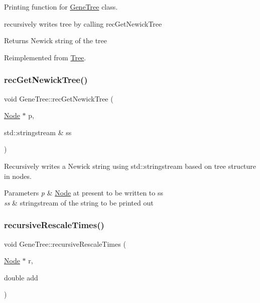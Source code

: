 Printing function for \mbox{\hyperlink{class_gene_tree}{Gene\+Tree}} class. 

recursively writes tree by calling rec\+Get\+Newick\+Tree \begin{DoxyReturn}{Returns}
Newick string of the tree 
\end{DoxyReturn}


Reimplemented from \mbox{\hyperlink{class_tree}{Tree}}.

\mbox{\label{class_gene_tree_a47d25bac2bc3d18e96a1b9c970bf6dc2}} 
\subsubsection{\texorpdfstring{recGetNewickTree()}{recGetNewickTree()}}
{\footnotesize\ttfamily void Gene\+Tree\+::rec\+Get\+Newick\+Tree (\begin{DoxyParamCaption}\item[{\mbox{\hyperlink{class_node}{Node}} $\ast$}]{p,  }\item[{std\+::stringstream \&}]{ss }\end{DoxyParamCaption})}



Recursively writes a Newick string using std\+::stringstream based on tree structure in nodes. 


\begin{DoxyParams}{Parameters}
{\em p} & \mbox{\hyperlink{class_node}{Node}} at present to be written to ss \\
\hline
{\em ss} & stringstream of the string to be printed out \\
\hline
\end{DoxyParams}
\mbox{\label{class_gene_tree_a3f9736710802274e64f167ff984d42ca}} 
\subsubsection{\texorpdfstring{recursiveRescaleTimes()}{recursiveRescaleTimes()}}
{\footnotesize\ttfamily void Gene\+Tree\+::recursive\+Rescale\+Times (\begin{DoxyParamCaption}\item[{\mbox{\hyperlink{class_node}{Node}} $\ast$}]{r,  }\item[{double}]{add }\end{DoxyParamCaption})}



